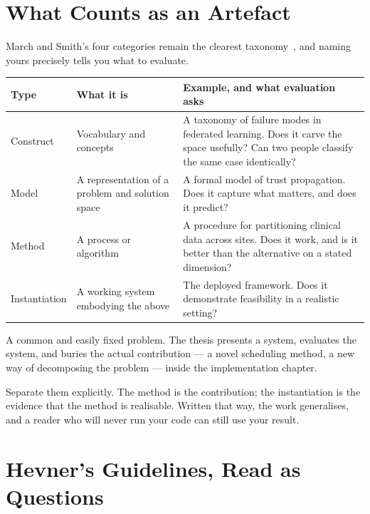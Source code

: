 \section{What Counts as an Artefact}

March and Smith's four categories remain the clearest
taxonomy~\cite{march1995design}, and naming yours precisely tells you what to
evaluate.

\begin{center}
\small
\begin{tabular}{@{}L{2.4cm}L{4.6cm}L{7.0cm}@{}}
\toprule
\textbf{Type} & \textbf{What it is} & \textbf{Example, and what evaluation asks} \\
\midrule
Construct
  & Vocabulary and concepts
  & A taxonomy of failure modes in federated learning. Does it carve the space
    usefully? Can two people classify the same case identically? \\
Model
  & A representation of a problem and solution space
  & A formal model of trust propagation. Does it capture what matters, and does
    it predict? \\
Method
  & A process or algorithm
  & A procedure for partitioning clinical data across sites. Does it work, and
    is it better than the alternative on a stated dimension? \\
Instantiation
  & A working system embodying the above
  & The deployed framework. Does it demonstrate feasibility in a realistic
    setting? \\
\bottomrule
\end{tabular}
\end{center}

\begin{conceptbox}
A common and easily fixed problem. The thesis presents a system, evaluates the
system, and buries the actual contribution --- a novel scheduling method, a new
way of decomposing the problem --- inside the implementation chapter.

\medskip
Separate them explicitly. The method is the contribution; the instantiation is
the evidence that the method is realisable. Written that way, the work
generalises, and a reader who will never run your code can still use your
result.
\end{conceptbox}

\section{Hevner's Guidelines, Read as Questions}

